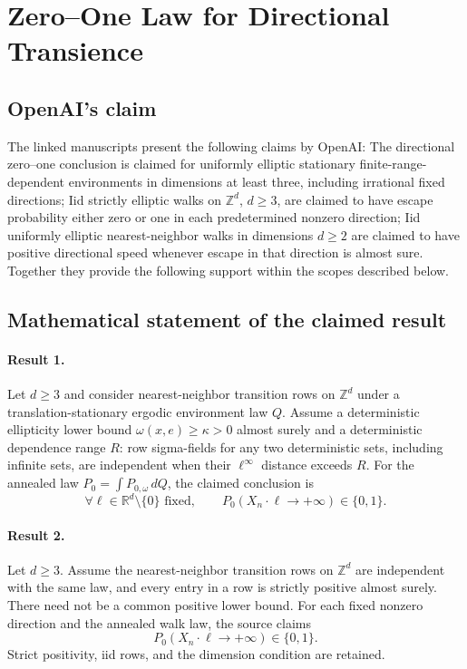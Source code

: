\documentclass[11pt]{article}
\begin{document}
\section*{Zero–One Law for Directional Transience}

\subsection{OpenAI's claim}
The linked manuscripts present the following claims by OpenAI: The directional zero--one conclusion is claimed for uniformly elliptic stationary finite-range-dependent environments in dimensions at least three, including irrational fixed directions; Iid strictly elliptic walks on $\mathbb Z^d$, $d\geq3$, are claimed to have escape probability either zero or one in each predetermined nonzero direction; Iid uniformly elliptic nearest-neighbor walks in dimensions $d\geq2$ are claimed to have positive directional speed whenever escape in that direction is almost sure. Together they provide the following support within the scopes described below.

\subsection{Mathematical statement of the claimed result}
\paragraph{Result 1.} Let \(d\ge3\) and consider nearest-neighbor transition rows on \(\mathbb Z^d\) under a translation-stationary ergodic environment law \(Q\). Assume a deterministic ellipticity lower bound \(\omega(x,e)\ge\kappa>0\) almost surely and a deterministic dependence range \(R\): row sigma-fields for any two deterministic sets, including infinite sets, are independent when their \(\ell^\infty\) distance exceeds \(R\). For the annealed law \(P_0=\int P_{0,\omega}\,dQ\), the claimed conclusion is
\[
 \forall\ell\in\mathbb R^d\setminus\{0\}\text{ fixed},\qquad
 P_0(X_n\cdot\ell\to+\infty)\in\{0,1\}.
\]

\paragraph{Result 2.} Let \(d\ge3\). Assume the nearest-neighbor transition rows on \(\mathbb Z^d\) are independent with the same law, and every entry in a row is strictly positive almost surely. There need not be a common positive lower bound. For each fixed nonzero direction and the annealed walk law, the source claims
\[
 P_0(X_n\cdot\ell\to+\infty)\in\{0,1\}.
\]
Strict positivity, iid rows, and the dimension condition are retained.
\end{document}
